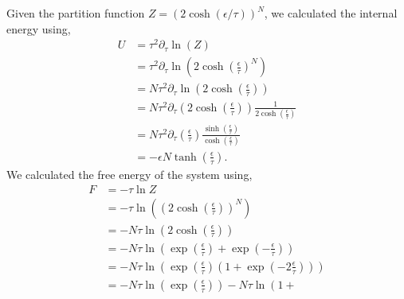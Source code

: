 \documentclass[a4paper]{article}
\begin{document}
    \begin{multicols}{2}
        Given the partition function \(Z = (2\cosh(\epsilon / \tau))^{N}\), we 
        calculated the internal energy using,
        \begin{align}
            U &= \tau^{2}\partial_{\tau}\ln(Z)\label{EQN1}\\
                &= \tau^{2}\partial_{\tau}
                    \ln\left(2\cosh\left(\frac{\epsilon}{\tau}\right)^{N}\right)
                    \nonumber \\
                &= N\tau^{2}\partial_{\tau}
                    \ln\left(2\cosh\left(\frac{\epsilon}{\tau}\right)\right)
                    \nonumber \\
                &= N\tau^{2}\partial_{\tau}
                    \left(2\cosh\left(\frac{\epsilon}{\tau}\right)\right)
                    \frac{1}{2\cosh\left(\frac{\epsilon}{\tau}\right)}
                    \nonumber \\
                &= N\tau^{2}\partial_{\tau}\left(\frac{\epsilon}{\tau}\right)
                    \frac{\sinh\left(\frac{\epsilon}{\tau}\right)}
                    {\cosh\left(\frac{\epsilon}{\tau}\right)}\nonumber \\
                &= -\epsilon N\tanh\left(\frac{\epsilon}{\tau}\right)
                    \label{EQN2}.
        \end{align}
        We calculated the free energy of the system using,
        \begin{align}
            F &= -\tau\ln Z \label{EQN3}\\
                &= -\tau\ln\left(\left(
                    2\cosh\left(\frac{\epsilon}{\tau}\right)\right)^{N}\right) 
                    \nonumber \\
                &= -N\tau\ln\left(
                    2\cosh\left(\frac{\epsilon}{\tau}\right)\right) 
                    \nonumber \\
                &= -N\tau\ln\left(
                    \exp\left(\frac{\epsilon}{\tau}\right) + 
                    \exp\left(-\frac{\epsilon}{\tau}\right)\right) \nonumber \\
                &= -N\tau\ln\left(\exp\left(\frac{\epsilon}{\tau}\right)
                    \left(1 + \exp\left(-2\frac{\epsilon}{\tau}\right)\right)
                    \right)\nonumber \\
                &= -N\tau\ln\left(\exp\left(\frac{\epsilon}{\tau}\right)\right)
                    - N\tau\ln\left(1 + 

\end{align}
\end{multicols}
\end{document}
